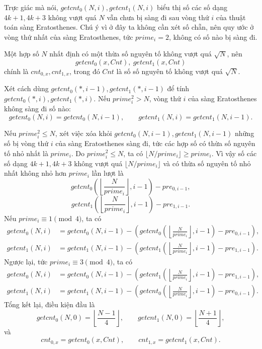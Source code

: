 \documentclass[11pt]{article}
\begin{document}
Trực giác mà nói, \(getcnt_0(N,i),getcnt_1(N,i)\) biểu thị số các số dạng
\(4k+1,4k+3\) không vượt quá \(N\) vẫn chưa bị sàng đi sau vòng thứ \(i\) của
thuật toán sàng Eratosthenes. Chú ý vì ở đây ta không cần xét số chẵn, nên
quy ước ở vòng thứ nhất của sàng Eratosthenes, tức \(prime_i=2\), không có số
nào bị sàng đi.

Một hợp số \(N\) nhất định có một thừa số nguyên tố không vượt quá \(\sqrt N\),
nên
\[
  getcnt_0(x,Cnt),\ getcnt_1(x,Cnt)
\]
chính là \(cnt_{0,x},cnt_{1,x}\), trong đó \(Cnt\) là số số nguyên tố không
vượt quá \(\sqrt N\).

Xét cách dùng \(getcnt_0(*,i-1),getcnt_1(*,i-1)\) để tính
\(getcnt_0(*,i),getcnt_1(*,i)\). Nếu \(prime_i^2>N\), vòng thứ \(i\) của sàng
Eratosthenes không sàng đi số nào:
\[
  getcnt_0(N,i)=getcnt_0(N,i-1),\qquad
  getcnt_1(N,i)=getcnt_1(N,i-1).
\]

Nếu \(prime_i^2\le N\), xét việc xóa khỏi
\(getcnt_0(N,i-1),getcnt_1(N,i-1)\) những số bị vòng thứ \(i\) của sàng
Eratosthenes sàng đi, tức các hợp số có thừa số nguyên tố nhỏ nhất là
\(prime_i\). Do \(prime_i^2\le N\), ta có
\(\lfloor N/prime_i\rfloor\ge prime_i\). Vì vậy số các số dạng \(4k+1,4k+3\)
không vượt quá \(\lfloor N/prime_i\rfloor\) và có thừa số nguyên tố nhỏ nhất
không nhỏ hơn \(prime_i\) lần lượt là
\[
  getcnt_0\left(\left\lfloor\frac{N}{prime_i}\right\rfloor,i-1\right)
  -pre_{0,i-1},
\]
\[
  getcnt_1\left(\left\lfloor\frac{N}{prime_i}\right\rfloor,i-1\right)
  -pre_{1,i-1}.
\]
Nếu \(prime_i\equiv1\pmod4\), ta có
\[
\begin{aligned}
getcnt_0(N,i)&=getcnt_0(N,i-1)-
\left(getcnt_0\left(\left\lfloor\frac{N}{prime_i}\right\rfloor,i-1\right)
-pre_{0,i-1}\right),\\
getcnt_1(N,i)&=getcnt_1(N,i-1)-
\left(getcnt_1\left(\left\lfloor\frac{N}{prime_i}\right\rfloor,i-1\right)
-pre_{1,i-1}\right).
\end{aligned}
\]
Ngược lại, tức \(prime_i\equiv3\pmod4\), ta có
\[
\begin{aligned}
getcnt_0(N,i)&=getcnt_0(N,i-1)-
\left(getcnt_1\left(\left\lfloor\frac{N}{prime_i}\right\rfloor,i-1\right)
-pre_{1,i-1}\right),\\
getcnt_1(N,i)&=getcnt_1(N,i-1)-
\left(getcnt_0\left(\left\lfloor\frac{N}{prime_i}\right\rfloor,i-1\right)
-pre_{0,i-1}\right).
\end{aligned}
\]
Tổng kết lại, điều kiện đầu là
\[
  getcnt_0(N,0)=\left\lfloor\frac{N-1}{4}\right\rfloor,\qquad
  getcnt_1(N,0)=\left\lfloor\frac{N+1}{4}\right\rfloor,
\]
và
\[
  cnt_{0,x}=getcnt_0(x,Cnt),\qquad cnt_{1,x}=getcnt_1(x,Cnt).
\]
\end{document}
